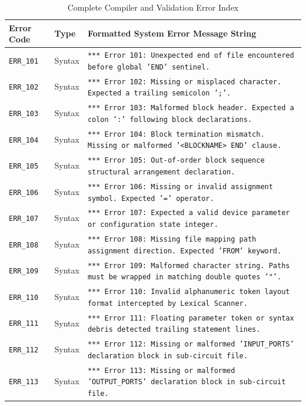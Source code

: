 \documentclass[10pt,a4paper]{article}
\begin{document}
\begin{longtable}{llp{8.2cm}}
\caption{Complete Compiler and Validation Error Index} \label{tab:appendix_errors} \\
\toprule
\textbf{Error Code} & \textbf{Type} & \textbf{Formatted System Error Message String} \\
\midrule
\endhead

\bottomrule
\endfoot

\bottomrule
\endlastfoot

\texttt{ERR\_101} & Syntax   & \texttt{*** Error 101: Unexpected end of file encountered before global 'END' sentinel.} \\ \addlinespace
\texttt{ERR\_102} & Syntax   & \texttt{*** Error 102: Missing or misplaced character. Expected a trailing semicolon ';'.} \\ \addlinespace
\texttt{ERR\_103} & Syntax   & \texttt{*** Error 103: Malformed block header. Expected a colon ':' following block declarations.} \\ \addlinespace
\texttt{ERR\_104} & Syntax   & \texttt{*** Error 104: Block termination mismatch. Missing or malformed '<BLOCKNAME> END' clause.} \\ \addlinespace
\texttt{ERR\_105} & Syntax   & \texttt{*** Error 105: Out-of-order block sequence structural arrangement declaration.} \\ \addlinespace
\texttt{ERR\_106} & Syntax   & \texttt{*** Error 106: Missing or invalid assignment symbol. Expected '=' operator.} \\ \addlinespace
\texttt{ERR\_107} & Syntax   & \texttt{*** Error 107: Expected a valid device parameter or configuration state integer.} \\ \addlinespace
\texttt{ERR\_108} & Syntax   & \texttt{*** Error 108: Missing file mapping path assignment direction. Expected 'FROM' keyword.} \\ \addlinespace
\texttt{ERR\_109} & Syntax   & \texttt{*** Error 109: Malformed character string. Paths must be wrapped in matching double quotes '"'.} \\ \addlinespace
\texttt{ERR\_110} & Syntax   & \texttt{*** Error 110: Invalid alphanumeric token layout format intercepted by Lexical Scanner.} \\ \addlinespace
\texttt{ERR\_111} & Syntax   & \texttt{*** Error 111: Floating parameter token or syntax debris detected trailing statement lines.} \\ \addlinespace
\texttt{ERR\_112} & Syntax   & \texttt{*** Error 112: Missing or malformed 'INPUT\_PORTS' declaration block in sub-circuit file.} \\ \addlinespace
\texttt{ERR\_113} & Syntax   & \texttt{*** Error 113: Missing or malformed 'OUTPUT\_PORTS' declaration block in sub-circuit file.} \\ \midrule


\end{longtable}
\end{document}
